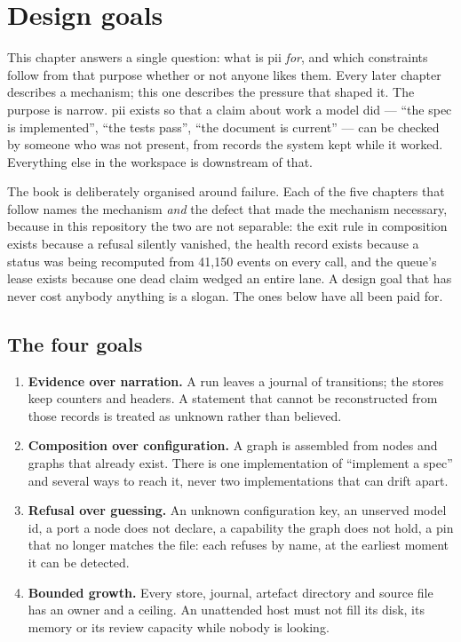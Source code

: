 \chapter{Design goals}

\label{ch:design-goals}

This chapter answers a single question: what is pii \emph{for}, and which constraints follow from
that purpose whether or not anyone likes them. Every later chapter describes a mechanism; this one
describes the pressure that shaped it. The purpose is narrow. pii exists so that a claim about work
a model did --- \enquote{the spec is implemented}, \enquote{the tests pass}, \enquote{the document
is current} --- can be checked by someone who was not present, from records the system kept while
it worked. Everything else in the workspace is downstream of that.

The book is deliberately organised around failure. Each of the five chapters that follow names the
mechanism \emph{and} the defect that made the mechanism necessary, because in this repository the
two are not separable: the exit rule in composition exists because a refusal silently vanished, the
health record exists because a status was being recomputed from 41{,}150 events on every call, and
the queue's lease exists because one dead claim wedged an entire lane. A design goal that has never
cost anybody anything is a slogan. The ones below have all been paid for.

\section{The four goals}

\begin{enumerate}
	\item \textbf{Evidence over narration.} A run leaves a journal of transitions; the stores keep
	counters and headers. A statement that cannot be reconstructed from those records is treated as
	unknown rather than believed.
	\item \textbf{Composition over configuration.} A graph is assembled from nodes and graphs that
	already exist. There is one implementation of \enquote{implement a spec} and several ways to
	reach it, never two implementations that can drift apart.
	\item \textbf{Refusal over guessing.} An unknown configuration key, an unserved model id, a
	port a node does not declare, a capability the graph does not hold, a pin that no longer matches
	the file: each refuses by name, at the earliest moment it can be detected.
	\item \textbf{Bounded growth.} Every store, journal, artefact directory and source file has an
	owner and a ceiling. An unattended host must not fill its disk, its memory or its review
	capacity while nobody is looking.
\end{enumerate}

